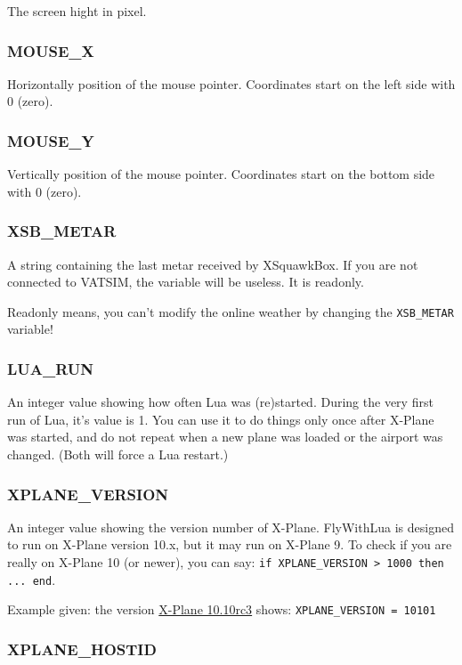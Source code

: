 \documentclass[11pt,parskip=half,a4paper]{scrartcl}
\begin{document}
The screen hight in pixel.

\subsubsection{MOUSE\_X}

Horizontally position of the mouse pointer. Coordinates start on the left side with 0 (zero).

\subsubsection{MOUSE\_Y}

Vertically position of the mouse pointer. Coordinates start on the bottom side with 0 (zero).

\subsubsection{XSB\_METAR}

A string containing the last metar received by XSquawkBox. If you are not connected to VATSIM, the variable will be useless. It is readonly.

Readonly means, you can't modify the online weather by changing the \verb|XSB_METAR| variable!

\subsubsection{LUA\_RUN}

An integer value showing how often Lua was (re)started. During the very first run of Lua, it's value is 1. You can use it to do things only once after X-Plane was started, and do not repeat when a new plane was loaded or the airport was changed. (Both will force a Lua restart.)

\subsubsection{XPLANE\_VERSION}

An integer value showing the version number of X-Plane. FlyWithLua is designed to run on X-Plane version 10.x, but it may run on X-Plane 9. To check if you are really on X-Plane 10 (or newer), you can say: \verb|if XPLANE_VERSION > 1000 then ... end|.

Example given: the version \href{http://wiki.x-plane.com/Beta#X-Plane_10.10_RC_3}{X-Plane 10.10rc3} shows: \verb|XPLANE_VERSION = 10101|

\subsubsection{XPLANE\_HOSTID}
\end{document}
